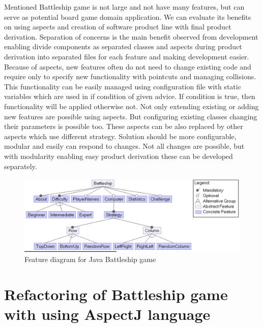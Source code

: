 \documentclass[11pt,slovak,a4paper,twoside]{article}
\begin{document}
Mentioned Battleship game is not large and not have many features, but can serve as potential board game domain application. We can evaluate its benefits on using aspects and creation of software product line with final product derivation. Separation of concerns is the main benefit observed from development enabling divide components as separated classes and aspects during product derivation into separated files for each feature and making development easier. Because of aspects, new features often do not need to change existing code and require only to specify new functionality with pointcuts and managing collisions. This functionality can be easily managed using configuration file with static variables which are used in if condition of given advice. If condition is true, then functionality will be applied otherwise not. Not only extending existing or adding new features are possible using aspects. But configuring existing classes changing their parameters is possible too. These aspects can be also replaced by other aspects which use different strategy. Solution should be more configurable, modular and easily can respond to changes. Not all changes are possible, but with modularity enabling easy product derivation these can be developed separately.



\begin{figure}[t]  %
					\begin{center}
									\includegraphics[width=\linewidth]{fig/battleshipFeatureModel.png}
									\caption{Feature diagram for Java Battleship game}
									\label{battleshipFeatureModel}
					\end{center}
\end{figure}


\section{Refactoring of Battleship game with using AspectJ language} \label{analysis}
\end{document}
